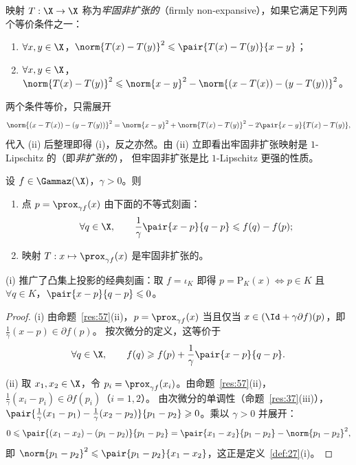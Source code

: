 \begin{definition}[牢固非扩张]
\label{def:27}
映射 $T:\X\to\X$ 称为\emph{牢固非扩张的}（firmly non-expansive），如果它满足下列两个等价条件之一：
\begin{enumerate}[label=(\roman*)]
  \item $\forall x,y\in\X$，$\norm{T(x)-T(y)}^2\leqslant\pair{T(x)-T(y)}{x-y}$；
  \item $\forall x,y\in\X$，$\norm{T(x)-T(y)}^2\leqslant\norm{x-y}^2-\norm{(x-T(x))-(y-T(y))}^2$。
\end{enumerate}
\end{definition}

两个条件等价，只需展开
\[
  \norm{(x-T(x))-(y-T(y))}^2=\norm{x-y}^2+\norm{T(x)-T(y)}^2-2\pair{x-y}{T(x)-T(y)} ,
\]
代入 (ii) 后整理即得 (i)，反之亦然。由 (ii) 立即看出牢固非扩张映射是 $1$-Lipschitz 的（即\emph{非扩张的}），
但牢固非扩张是比 $1$-Lipschitz 更强的性质。

\begin{proposition}
\label{res:58}
设 $f\in\Gammaz(\X)$，$\gamma>0$。则
\begin{enumerate}[label=(\roman*)]
  \item 点 $p=\prox_{\gamma f}(x)$ 由下面的不等式刻画：
  \[
    \forall q\in\X,\qquad \frac1\gamma\pair{x-p}{q-p}\leqslant f(q)-f(p);
  \]
  \item 映射 $T:x\mapsto\prox_{\gamma f}(x)$ 是牢固非扩张的。
\end{enumerate}
\end{proposition}

(i) 推广了凸集上投影的经典刻画：取 $f=\iota_K$ 即得 $p=\mathrm P_K(x)\iff p\in K$ 且 $\forall q\in K$，$\pair{x-p}{q-p}\leqslant0$。

\begin{proof}
(i) 由命题~\ref{res:57}(ii)，$p=\prox_{\gamma f}(x)$ 当且仅当 $x\in(\Id+\gamma\partial f)(p)$，即 $\frac1\gamma(x-p)\in\partial f(p)$。
按次微分的定义，这等价于
\[
  \forall q\in\X,\qquad f(q)\geqslant f(p)+\frac1\gamma\pair{x-p}{q-p}.
\]

(ii) 取 $x_1,x_2\in\X$，令 $p_i=\prox_{\gamma f}(x_i)$。由命题~\ref{res:57}(ii)，$\frac1\gamma(x_i-p_i)\in\partial f(p_i)$（$i=1,2$）。
由次微分的单调性（命题~\ref{res:37}(iii)），$\pair{\frac1\gamma(x_1-p_1)-\frac1\gamma(x_2-p_2)}{p_1-p_2}\geqslant0$。乘以 $\gamma>0$ 并展开：
\[
  0\leqslant\pair{(x_1-x_2)-(p_1-p_2)}{p_1-p_2}=\pair{x_1-x_2}{p_1-p_2}-\norm{p_1-p_2}^2 ,
\]
即 $\norm{p_1-p_2}^2\leqslant\pair{p_1-p_2}{x_1-x_2}$，这正是定义~\ref{def:27}(i)。
\end{proof}

